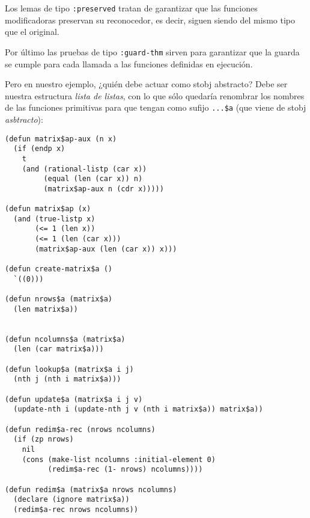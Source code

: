 \documentclass[a4paper,10pt]{article}
\begin{document}
\par \vspace{10pt}

Los lemas de tipo \texttt{:preserved} tratan de garantizar que las funciones modificadoras preservan su reconocedor, es decir, siguen siendo del mismo tipo que el original.

\par \vspace{10pt}

Por último las pruebas de tipo \texttt{:guard-thm} sirven para garantizar que la guarda se cumple para cada llamada a las funciones definidas en ejecución. 

\par \vspace{10pt}

Pero en nuestro ejemplo, ¿quién debe actuar como stobj abstracto? Debe ser nuestra estructura \emph{lista de listas}, con lo que sólo quedaría renombrar los nombres de las funciones primitivas para que tengan como sufijo \texttt{...\$a} (que viene de stobj \emph{asbtracto}):

\par \vspace{10pt}

\begin{lstlisting}[language=clips]
(defun matrix$ap-aux (n x)
  (if (endp x)
    t
    (and (rational-listp (car x))
         (equal (len (car x)) n)
         (matrix$ap-aux n (cdr x)))))

(defun matrix$ap (x)
  (and (true-listp x)
       (<= 1 (len x))
       (<= 1 (len (car x)))
       (matrix$ap-aux (len (car x)) x)))

(defun create-matrix$a ()
  `((0)))

(defun nrows$a (matrix$a)
  (len matrix$a))


(defun ncolumns$a (matrix$a)
  (len (car matrix$a)))

(defun lookup$a (matrix$a i j)
  (nth j (nth i matrix$a)))

(defun update$a (matrix$a i j v)
  (update-nth i (update-nth j v (nth i matrix$a)) matrix$a))

(defun redim$a-rec (nrows ncolumns)
  (if (zp nrows)
    nil
    (cons (make-list ncolumns :initial-element 0) 
          (redim$a-rec (1- nrows) ncolumns))))

(defun redim$a (matrix$a nrows ncolumns)
  (declare (ignore matrix$a)) 
  (redim$a-rec nrows ncolumns))
\end{lstlisting}
\end{document}
